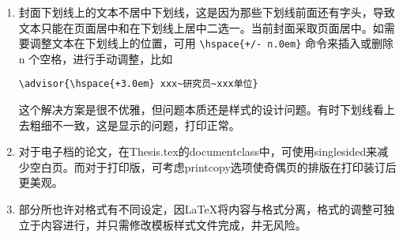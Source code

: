 \begin{enumerate}
\begin{itemize}
                \verb|\RequirePackage{fontspec}|

                行下添加如下中文字体调用命令：
                {
                    \scriptsize
\begin{verbatim}
\setCJKmainfont[BoldFont=Songti SC Bold,ItalicFont=Kaiti SC]{Songti SC Light}%
\setCJKsansfont{Heiti SC}%
\end{verbatim}
                }
        \end{itemize}

        字库调用的全面解释可参见 \href{https://ctan.org/pkg/fontspec}{fontspec} （英文字体调用）和 \href{https://ctan.org/pkg/xecjk?lang=en}{xeCJK} （中文字体调用）。因为模版的设定考虑兼顾不同操作系统（Windows, Linux, Mac OS），为了模版的健壮性，上述字体设置和调用方案并未作为原始设定。

    \item 封面下划线上的文本不居中下划线，这是因为那些下划线前面还有字头，导致文本只能在页面居中和在下划线上居中二选一。当前封面采取页面居中。如需要调整文本在下划线上的位置，可用 \verb|\hspace{+/- n.0em}| 命令来插入或删除 n 个空格，进行手动调整，比如

        \verb|\advisor{\hspace{+3.0em} xxx~研究员~xxx单位}|
                
                这个解决方案是很不优雅，但问题本质还是样式的设计问题。有时下划线看上去粗细不一致，这是显示的问题，打印正常。

    \item 对于电子档的论文，在Thesis.tex的documentclass中，可使用singlesided来减少空白页。而对于打印版，可考虑printcopy选项使奇偶页的排版在打印装订后更美观。

    \item 部分所也许对格式有不同设定，因\LaTeX{}将内容与格式分离，格式的调整可独立于内容进行，并只需修改模板样式文件完成，并无风险。
\end{enumerate}


